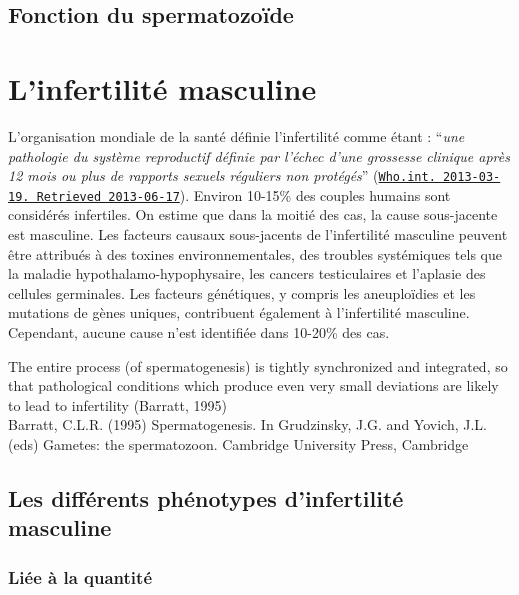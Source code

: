 \documentclass[12pt,twoside]{reedthesis}
\theoremstyle{definition}
\theoremstyle{definition}
\theoremstyle{remark}
\begin{document}
  \subsection{Fonction du spermatozoïde}\label{fonction-du-spermatozoide}
  
  \section{L'infertilité masculine}\label{linfertilite-masculine}
  
  L'organisation mondiale de la santé définie l'infertilité comme étant :
  ``\emph{une pathologie du système reproductif définie par l'échec d'une
  grossesse clinique après 12 mois ou plus de rapports sexuels réguliers
  non protégés}''
  (\href{http://www.who.int/reproductivehealth/topics/infertility/definitions/en/}{\texttt{Who.int.\ 2013-03-19.\ Retrieved\ 2013-06-17}}).
  Environ 10-15\% des couples humains sont considérés infertiles. On
  estime que dans la moitié des cas, la cause sous-jacente est masculine.
  Les facteurs causaux sous-jacents de l'infertilité masculine peuvent
  être attribués à des toxines environnementales, des troubles systémiques
  tels que la maladie hypothalamo-hypophysaire, les cancers testiculaires
  et l'aplasie des cellules germinales. Les facteurs génétiques, y compris
  les aneuploïdies et les mutations de gènes uniques, contribuent
  également à l'infertilité masculine. Cependant, aucune cause n'est
  identifiée dans 10-20\% des cas.
  
  The entire process (of spermatogenesis) is tightly synchronized and
  integrated, so that pathological conditions which produce even very
  small deviations are likely to lead to infertility (Barratt, 1995)\\
  Barratt, C.L.R. (1995) Spermatogenesis. In Grudzinsky, J.G. and Yovich,
  J.L. (eds) Gametes: the spermatozoon. Cambridge University Press,
  Cambridge
  
  \subsection{Les différents phénotypes d'infertilité
  masculine}\label{les-differents-phenotypes-dinfertilite-masculine}
  
  \subsubsection{Liée à la quantité}\label{liee-a-la-quantite}
  
\end{document}
